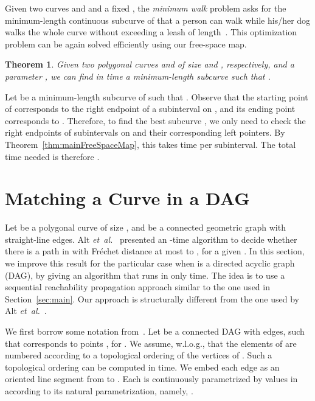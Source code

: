 \documentclass[12pt]{dalthesis}
\def\favoritefont{\bfseries \sffamily}
\def\QED{\ensuremath{{\Box}}}
\def\markatright#1{\leavevmode\unskip\nobreak\quad\hspace*{\fill}{#1}}
\newenvironment{proof}
	{\begin{trivlist}\item[\hskip\labelsep{\favoritefont Proof:}]}
	{\markatright{\QED}\end{trivlist}}
\newtheorem{theorem}{Theorem}
\newcommand{\qed}{}
\newcommand{\etal}{{\em et~al.\/}}
\newcommand{\Frechet}{Fr\'echet }
\newcommand{\fs}{free-space }
\begin{document}
Given two curves  and  and a fixed , 
the \emph{minimum walk} problem asks for the minimum-length continuous subcurve of
 that a person can walk while his/her dog walks the whole curve 
without exceeding a leash of length~. 
This optimization problem can be again solved efficiently 
using our \fs map. 

\begin{theorem} \label{thm:min}
	Given two polygonal curves  and  of size  and , respectively,
	and a parameter ,
	we can find in  time a minimum-length subcurve  such that 
	.
\end{theorem}

\begin{proof}
	Let  be a minimum-length subcurve of  such that .
	Observe that the starting point of  corresponds to 
	the right endpoint of a subinterval  on ,
	and its ending point corresponds to . 
	Therefore, to find the best subcurve , 
	we only need to check the right endpoints of 
	subintervals on  and their corresponding left pointers.
	By Theorem~\ref{thm:mainFreeSpaceMap}, this takes  time per subinterval.
	The total time needed is therefore .
	\qed
\end{proof}




\section{Matching a Curve in a DAG} \label{sec:graph}

Let  be a polygonal curve of size , 
and  be a connected geometric graph with  straight-line edges.
Alt \etal~\cite{AltERW03a} presented an -time algorithm 
to decide whether
there is a path  in  with \Frechet distance at most  to , 
for a given .
In this section, 
we improve this result for the particular case when  is a directed acyclic graph (DAG), 
by giving an algorithm that runs in only  time.
The idea is to use a sequential reachability propagation approach 
similar to the one used in Section~\ref{sec:main}.
Our approach is structurally different from
the one used by Alt \etal~\cite{AltERW03a}.


We first borrow some notation from~\cite{AltERW03a}.
Let  be a connected DAG with  edges,
such that 
corresponds to points , for .
We assume, w.l.o.g., that the elements of  are numbered
according to a topological ordering of the vertices of .
Such a topological ordering can be computed in  time.
We embed each edge  as
an oriented line segment  from  to . 
Each  is continuously parametrized 
by values in  according to its natural parametrization,
namely, .
\end{document}
